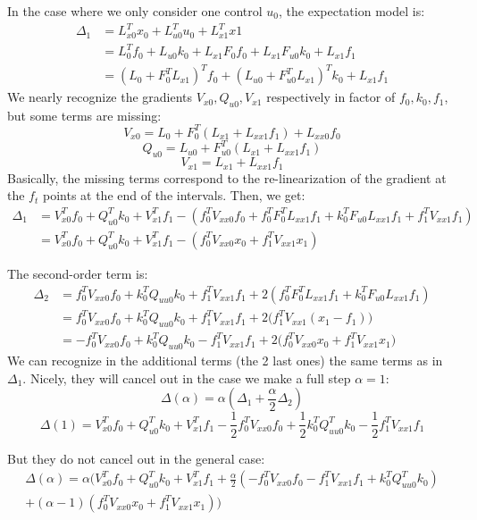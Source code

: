 \documentclass[10pt,a4paper]{article}
\begin{document}
In the case where we only consider one control $u_0$, the expectation model is:
\begin{align*}
  \Delta_1 &= L_{x0}^T x_0 + L_{u0}^T u_0 + L_{x1}^T x1 \\
  &= L_{0}^T f_0 + L_{u0} k_0 + L_{x1} F_{0} f_0  + L_{x1} F_{u0} k_0  + L_{x1} f_1 \\
  &= (L_0 + F_0^T L_{x1})^T f_0 + (L_{u0} + F_{u0}^T L_{x1})^T k_0 + L_{x1} f_1
\end{align*}
We nearly recognize the gradients $V_{x0}, Q_{u0}, V_{x1}$ respectively in factor of $f_0,k_0,f_1$, but some terms are missing:
$$V_{x0} = L_0 + F_0^T (L_{x1} + L_{xx1} f_1) + L_{xx0} f_0$$
$$Q_{u0} = L_{u0} + F_{u0}^T (L_{x1} + L_{xx1} f_1)$$
$$V_{x1} = L_{x1} + L_{xx1} f_1$$
Basically, the missing terms correspond to the re-linearization of the gradient at the $f_t$ points at the end of the intervals.
Then, we get:
\begin{align*}
  \Delta_1 &= V_{x0}^T f_0 + Q_{u0}^T k_0 + V_{x1}^T f_1 - \left( f_0^T V_{xx0} f_0  + f_0^T F_0^T L_{xx1} f_1 + k_0^T F_{u0} L_{xx1} f_1 + f_1^T V_{xx1} f_1\right) \\
  &= V_{x0}^T f_0 + Q_{u0}^T k_0 + V_{x1}^T f_1 - \left( f_0^T V_{xx0} x_0 + f_1^T V_{xx1} x_1 \right)
\end{align*}

The second-order term is:
\begin{align*}
  \Delta_2 &= f_0^T V_{xx0} f_0 + k_0^T Q_{uu0} k_0 + f_1^T V_{xx1} f_1 + 2(f_0^T F_0^T L_{xx1} f_1 + k_0^T F_{u0} L_{xx1} f_1) \\
  &= f_0^T V_{xx0} f_0 + k_0^T Q_{uu0} k_0 + f_1^T V_{xx1} f_1 + 2\big(f_1^T V_{xx1} (x_1-f_1) \big) \\
  &= -f_0^T V_{xx0} f_0 + k_0^T Q_{uu0} k_0 - f_1^T V_{xx1} f_1 + 2\big(f_0^T V_{xx0} x_0 + f_1^T V_{xx1} x_1 \big)
\end{align*}
We can recognize in the additional terms (the 2 last ones) the same terms as in $\Delta_1$.
Nicely, they will cancel out in the case we make a full step $\alpha=1$:
$$\Delta(\alpha) = \alpha( \Delta_1+\frac{\alpha}{2} \Delta_2)$$
$$\Delta(1)= V_{x0}^T f_0 + Q_{u0}^T k_0 + V_{x1}^T f_1
- \frac{1}{2} f_0^T V_{xx0} f_0 + \frac{1}{2} k_0^T Q_{uu0}^T k_0 - \frac{1}{2} f_1^T V_{xx1} f_1 $$

But they do not cancel out in the general case:
\begin{align*}
  \Delta(\alpha) = \alpha \Big( V_{x0}^T f_0 + Q_{u0}^T k_0 + V_{x1}^T f_1
+ \frac{\alpha}{2} ( - f_0^T V_{xx0} f_0 - f_1^T V_{xx1} f_1 + k_0^T Q_{uu0}^T k_0 ) \\
+ (\alpha-1) ( f_0^T V_{xx0} x_0 + f_1^T V_{xx1} x_1 ) \Big)
\end{align*}
\end{document}
